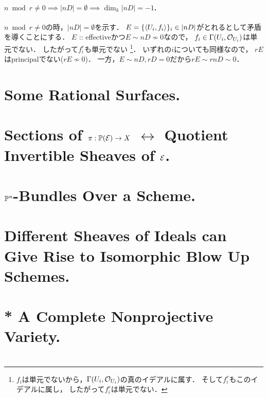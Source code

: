 \documentclass[a4paper]{jsarticle}
\begin{document}
    \paragraph{$n \bmod r \neq 0 \implies |nD|=\emptyset \implies \dim_k |nD|=-1$.}
    $n \bmod r \neq 0$の時，$|nD|=\emptyset$を示す．
    $E=\{\langle U_i,f_i \rangle\}_i \in |nD|$がとれるとして矛盾を導くことにする．
    $E$ :: effectiveかつ$E \sim nD \not \sim 0$なので，
    $f_i \in \Gamma(U_i, \mathcal{O}_{U_i})$は単元でない．
    したがって$f_i^r$も単元でない
    \footnote
    {
        $f_i$は単元でないから，$\Gamma(U_i, \mathcal{O}_{U_i})$の真のイデアルに属す．
        そして$f_i^r$もこのイデアルに属し，
        したがって$f_i^r$は単元でない．
    }．
    いずれの$i$についても同様なので，
    $rE$はprincipalでない($rE \not \sim 0$)．
    一方，$E \sim nD, rD=0$だから$rE \sim rnD \sim 0$．

\section{Some Rational Surfaces.} %

\section{Sections of $\pi: \mathbb{P}(\mathcal{E}) \to X$
    $\leftrightarrow$ Quotient Invertible Sheaves of $\mathcal{E}$.} %

\section{ } %

\section{$\mathbb{P}^n$-Bundles Over a Scheme.} %

\section{Different Sheaves of Ideals can Give Rise to Isomorphic Blow Up Schemes.} %

\section{ } %

\section{* A Complete Nonprojective Variety.} %

\section{ } %
\end{document}
